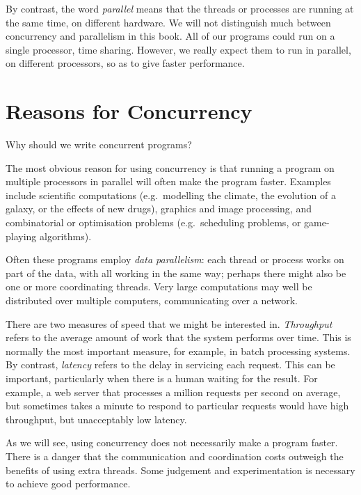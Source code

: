 By contrast, the word \emph{parallel} means that the threads or processes are
running at the same time, on different hardware.  We will not distinguish much
between concurrency and parallelism in this book.  All of our programs could
run on a single processor, time sharing.  However, we really expect them to
run in parallel, on different processors, so as to give faster performance.


\section{Reasons for Concurrency}

Why should we write concurrent programs?

The most obvious reason for using concurrency is that running a program on
multiple processors in parallel will often make the program faster.  Examples
include scientific computations (e.g.~modelling the climate, the evolution of
a galaxy, or the effects of new drugs), graphics and image processing, and
combinatorial or optimisation problems (e.g.~scheduling problems, or
game-playing algorithms).  

Often these programs employ \emph{data parallelism}: each thread or process
works on part of the data, with all working in the same way; perhaps there
might also be one or more coordinating threads.  Very large computations may
well be distributed over multiple computers, communicating over a network.

There are two measures of speed that we might be interested in.
\emph{Throughput} refers to the average amount of work that the system
performs over time.  This is normally the most important measure, for example,
in batch processing systems.  By contrast, \emph{latency} refers to the delay
in servicing each request.  This can be important, particularly when there is
a human waiting for the result.  For example, a web server that processes
a million requests per second on average, but sometimes takes a minute to
respond to particular requests would have high throughput, but unacceptably
low latency.

As we will see, using concurrency does not necessarily make a program faster.
There is a danger that the communication and coordination costs outweigh the
benefits of using extra threads.  Some judgement and experimentation is
necessary to achieve good performance. 

